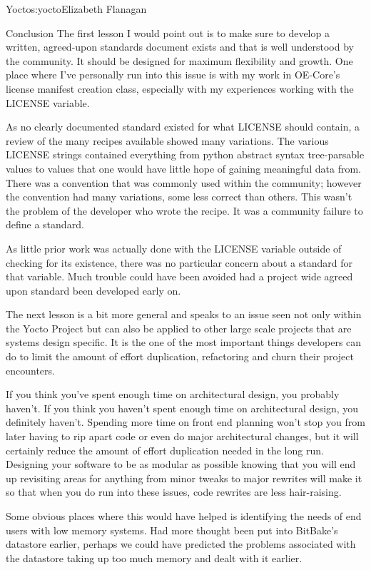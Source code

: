 \begin{aosachapter}{Yocto}{s:yocto}{Elizabeth Flanagan}
\begin{aosasect1}{Conclusion}
The first lesson I would point out is to make sure to develop a
written, agreed-upon standards document exists and that is well
understood by the community. It should be designed for maximum
flexibility and growth. One place where I've personally run into this
issue is with my work in OE-Core's license manifest creation class,
especially with my experiences working with the LICENSE variable.

As no clearly documented standard existed for what LICENSE should
contain, a review of the many recipes available showed many
variations. The various LICENSE strings contained everything from
python abstract syntax tree-parsable values to values that one would
have little hope of gaining meaningful data from. There was a
convention that was commonly used within the community; however the
convention had many variations, some less correct than others. This
wasn't the problem of the developer who wrote the recipe. It was a
community failure to define a standard.

As little prior work was actually done with the LICENSE variable
outside of checking for its existence, there was no particular concern
about a standard for that variable. Much trouble could have been
avoided had a project wide agreed upon standard been developed early
on.

The next lesson is a bit more general and speaks to an issue seen not
only within the Yocto Project but can also be applied to other large
scale projects that are systems design specific. It is the one of the
most important things developers can do to limit the amount of effort
duplication, refactoring and churn their project encounters.

If you think you've spent enough time on architectural design, you
probably haven't. If you think you haven't spent enough time on
architectural design, you definitely haven't. Spending more time on
front end planning won't stop you from later having to rip apart code
or even do major architectural changes, but it will certainly reduce
the amount of effort duplication needed in the long run. Designing
your software to be as modular as possible knowing that you will end
up revisiting areas for anything from minor tweaks to major rewrites
will make it so that when you do run into these issues, code rewrites
are less hair-raising.

Some obvious places where this would have helped is identifying the
needs of end users with low memory systems. Had more thought been put
into BitBake's datastore earlier, perhaps we could have predicted the
problems associated with the datastore taking up too much memory and
dealt with it earlier.


\end{aosasect1}
\end{aosachapter}
